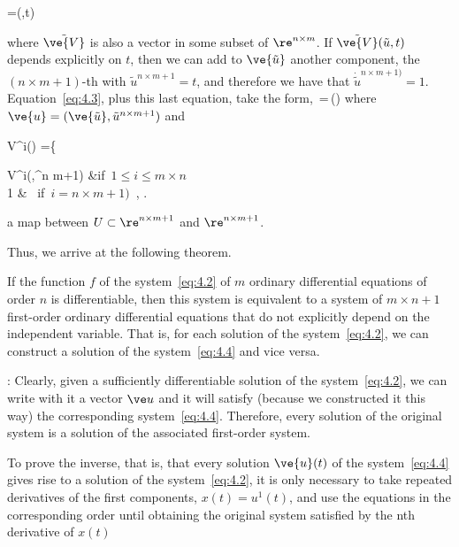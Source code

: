 \beq 
{}=(,t)  \label{eq:4.3}
\eeq 

\noindent where $\tilde{\ve{V}}$ is also a vector in some
subset of $\re^{n \times m}$.
If $\tilde{\ve{V}}(\tilde{u},t)$ depends explicitly on $t$, then
we can add to
$\ve{\tilde{u}}$ another component, the $(n \times m +1)$-th with $\tilde{u}^{n \times m +1}=t$, 
and therefore we have that $\dot{\tilde{u}}^{n \times m + 1)} = 1$.
Equation~\ref{eq:4.3}, plus this
last equation, take the form,
\beq
{}\,=\,()      \label{eq:4.4}
\eeq
where $\ve{u} = (\ve{\tilde{u}}, \tilde{u}^{n \times m+1})$ and

\beq
V^i() =\left\{ 

  \tilde V^i(,^{n \times m+1}) &\mbox{if $1\leq i \leq m\times n$}\\
            1                   & \mbox{ if $i = n \times m + 1) $ ,}
                               \earr
                      \right.       
\eeq

\noindent a map between $U\subset \re^{n \times m+1}$ and
$\re^{n \times m + 1}$.



\noindent Thus, we arrive at the following theorem.

\begin{teo}[Reduction]
If the function $f$ of the system~\ref{eq:4.2} of $m$ ordinary differential 
equations of order $n$ is differentiable, then this system is equivalent 
to a system of $m\times n+1$ first-order ordinary differential equations 
that do not explicitly depend on the independent variable. That is, for each
solution of the system~\ref{eq:4.2}, we can construct a solution of the
system~\ref{eq:4.4} and vice versa.
\label{teo:4.1}
\end{teo}

\pru:
 Clearly, given a sufficiently differentiable solution of the system~\ref{eq:4.2},
we can write
with it a vector $\ve u$ and it will satisfy (because we constructed it this way)
the corresponding system~\ref{eq:4.4}. Therefore, every solution
of the original system is a solution of the associated first-order system.

To prove the inverse, that is, that every solution 
$\ve{u}(t)$ of the system~\ref{eq:4.4} gives rise to a 
solution of the system~\ref{eq:4.2}, it is only necessary to take repeated
derivatives of the first components, $x(t) = u^1(t)$, and use
the equations in the corresponding order until obtaining 
the original system satisfied by the nth derivative of $x(t)$
\epru



